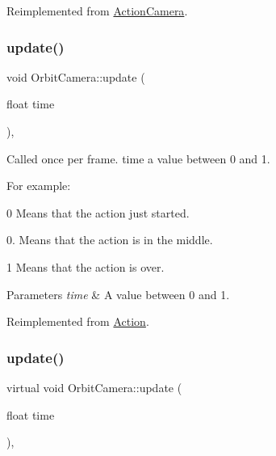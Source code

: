Reimplemented from \hyperlink{classActionCamera_ab523607be45f90017decf4c5e493c733}{Action\+Camera}.

\mbox{\label{classOrbitCamera_af3b5763c1f141127cdb131f1f232d67d}} 
\subsubsection{\texorpdfstring{update()}{update()}\hspace{0.1cm}{\footnotesize\ttfamily [1/2]}}
{\footnotesize\ttfamily void Orbit\+Camera\+::update (\begin{DoxyParamCaption}\item[{float}]{time }\end{DoxyParamCaption})\hspace{0.3cm}{\ttfamily [override]}, {\ttfamily [virtual]}}

Called once per frame. time a value between 0 and 1.

For example\+:
\begin{DoxyItemize}
\item 0 Means that the action just started.
\item 0. Means that the action is in the middle.
\item 1 Means that the action is over.
\end{DoxyItemize}


\begin{DoxyParams}{Parameters}
{\em time} & A value between 0 and 1. \\
\hline
\end{DoxyParams}


Reimplemented from \hyperlink{classAction_a937e646e63915e33ad05ba149bfcf239}{Action}.

\mbox{\label{classOrbitCamera_a98a17a86d8b352e6a828b1ee8b096742}} 
\subsubsection{\texorpdfstring{update()}{update()}\hspace{0.1cm}{\footnotesize\ttfamily [2/2]}}
{\footnotesize\ttfamily virtual void Orbit\+Camera\+::update (\begin{DoxyParamCaption}\item[{float}]{time }\end{DoxyParamCaption})\hspace{0.3cm}{\ttfamily [override]}, {\ttfamily [virtual]}}

